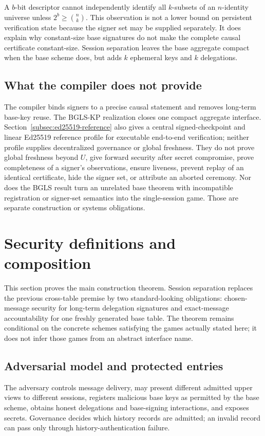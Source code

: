 \documentclass[11pt]{article}
\theoremstyle{definition}
\begin{document}
A $b$-bit descriptor cannot independently identify all $k$-subsets of an $n$-identity universe unless $2^b\geq\binom nk$.  This observation is not a lower bound on persistent verification state because the signer set may be supplied separately.  It does explain why constant-size base signatures do not make the complete causal certificate constant-size.  Session separation leaves the base aggregate compact when the base scheme does, but adds $k$ ephemeral keys and $k$ delegations.

\subsection{What the compiler does not provide}
The compiler binds signers to a precise causal statement and removes long-term base-key reuse.  The BGLS-KP realization closes one compact aggregate interface.  Section~\ref{subsec:ed25519-reference} also gives a central signed-checkpoint and linear Ed25519 reference profile for executable end-to-end verification; neither profile supplies decentralized governance or global freshness.  They do not prove global freshness beyond $U$, give forward security after secret compromise, prove completeness of a signer's observations, ensure liveness, prevent replay of an identical certificate, hide the signer set, or attribute an aborted ceremony.  Nor does the BGLS result turn an unrelated base theorem with incompatible registration or signer-set semantics into the single-session game.  Those are separate construction or systems obligations.

\section{Security definitions and composition}\label{sec:security}
This section proves the main construction theorem.  Session separation replaces the previous cross-table premise by two standard-looking obligations: chosen-message security for long-term delegation signatures and exact-message accountability for one freshly generated base table.  The theorem remains conditional on the concrete schemes satisfying the games actually stated here; it does not infer those games from an abstract interface name.

\subsection{Adversarial model and protected entries}
The adversary controls message delivery, may present different admitted upper views to different sessions, registers malicious base keys as permitted by the base scheme, obtains honest delegations and base-signing interactions, and exposes secrets.  Governance decides which history records are admitted; an invalid record can pass only through history-authentication failure.
\end{document}
